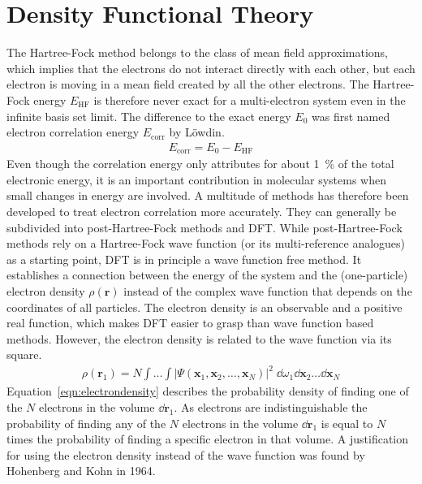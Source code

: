 \section{Density Functional Theory}
\label{sec:dft}

The Hartree-Fock method belongs to the class of mean field approximations,
which implies that the electrons do not interact directly with each other, but
each electron is moving in a mean field created by all the other electrons. The
Hartree-Fock energy $E_\text{HF}$ is therefore never exact for a multi-electron
system even in the infinite basis set limit. The difference to the exact energy
$E_0$ was first named electron correlation energy $E_\text{corr}$ by
L\"owdin\autocite{Lowdin_CorrelationProblemManyElectron_1958}.
%
\begin{align}
    E_\text{corr} = E_0 - E_\text{HF}
\end{align}
%
Even though the correlation energy only attributes for about \SI{1}{\percent}
of the total electronic energy, it is an important contribution in molecular
systems when small changes in energy are involved. A multitude of methods has
therefore been developed to treat electron correlation more accurately. They
can generally be subdivided into post-Hartree-Fock methods  and \ac{DFT}. While
post-Hartree-Fock methods rely on a Hartree-Fock wave function (or its
multi-reference analogues) as a starting point, \ac{DFT} is in principle a wave
function free method. It establishes a connection between the energy of the
system and the (one-particle) electron density $\rho({\mathbf r})$ instead of
the complex wave function that depends on the coordinates of all particles. The
electron density is an observable and a positive real function, which makes
\ac{DFT} easier to grasp than wave function based methods. However, the
electron density is related to the wave function via its square. 
%
\begin{align}
    \rho(\mathbf{r}_1)=N\int\dots\int|\Psi(\mathbf{x}_1,\mathbf{x}_2,\dots,\mathbf{x}_N)|^2\;\dd\omega_1\dd\mathbf{x}_2\dots\dd\mathbf{x}_N\label{eqn:electrondensity}
\end{align}
%
Equation~\eqref{eqn:electrondensity} describes the probability density of
finding one of the $N$ electrons in the volume $\dd \mathbf{r}_1$. As electrons
are indistinguishable the probability of finding any of the $N$ electrons in
the volume $\dd\mathbf{r}_1$ is equal to $N$ times the probability of finding a
specific electron in that volume.  A justification for using the electron
density instead of the wave function was found by Hohenberg and Kohn in
1964.\autocite{Hohenberg_InhomogeneousElectronGas_1964}

